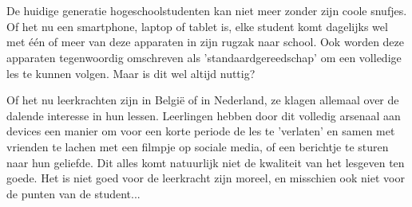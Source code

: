 
%
%

%



\chapter*{}

De huidige generatie hogeschoolstudenten kan niet meer zonder zijn coole snufjes. Of het nu een smartphone, laptop of tablet is, elke student komt dagelijks wel met één of meer van deze apparaten in zijn rugzak naar school. Ook worden deze apparaten tegenwoordig omschreven als 'standaardgereedschap' om een volledige les te kunnen volgen. Maar is dit wel altijd nuttig? 

Of het nu leerkrachten zijn in België of in Nederland, ze klagen allemaal over de dalende interesse in hun lessen. Leerlingen hebben door dit volledig arsenaal aan devices een manier om voor een korte periode de les te 'verlaten' en samen met vrienden te lachen met een filmpje op sociale media, of een berichtje te sturen naar hun geliefde. Dit alles komt natuurlijk niet de kwaliteit van het lesgeven ten goede. Het is niet goed voor de leerkracht zijn moreel, en misschien ook niet voor de punten van de student... 

